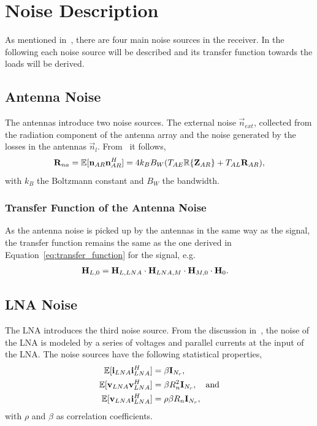 \section{Noise Description}
\label{sec:noise_description}

As mentioned in~\cite{Yahia2013}, there are four main noise sources in the receiver.
In the following each noise source will be described and its transfer function towards the loads will be derived. 

\subsection{Antenna Noise}
\label{sec:antenna_noise}

The antennas introduce two noise sources.
The external noise $\vec{n}_{ext}$, collected from the radiation component of the antenna array and the noise generated by the losses in the antennas $\vec{n}_l$.
From~\cite{Twiss1955} it follows, 
\begin{equation}
\label{eq:cov_ant}
\mathbf{R}_{na} = \mathbb{E}[\mathbf{n}_{AR}\mathbf{n}_{AR}^H] = 4 k_B B_W(T_{AE}\mathbb{R}\{\mathbf{Z}_{AR}\}+T_{AL}\mathbf{R}_{AR}),
\end{equation}
with $k_B$ the Boltzmann constant and $B_W$ the bandwidth.

\subsubsection{Transfer Function of the Antenna Noise}
\label{sec:antenna_noise_transf}
As the antenna noise is picked up by the antennas in the same way as the signal, the transfer function remains the same as the one derived in Equation~\eqref{eq:transfer_function} for the signal, e.g.
\begin{align}
\mathbf{H}_{L,0} &= \mathbf{H}_{L,LNA}\cdot\mathbf{H}_{LNA,M}\cdot\mathbf{H}_{M,0}\cdot\mathbf{H}_{0}.
\end{align}

\subsection{LNA Noise}
\label{sec:lna_noise}

The LNA introduces the third noise source.
From the discussion in~\cite{Nossek}, the noise of the LNA is modeled by a series of voltages and parallel currents at the input of the LNA.
The noise sources have the following statistical properties,
\begin{align}
\label{eq:cov_lna}
\mathbb{E}[\mathbf{i}_{LNA}\mathbf{i}_{LNA}^H] &= \beta \mathbf{I}_{N_r},\\\nonumber
\mathbb{E}[\mathbf{v}_{LNA}\mathbf{v}_{LNA}^H] &= \beta R_n^2\mathbf{I}_{N_r},\quad\text{and}\\\nonumber
\mathbb{E}[\mathbf{v}_{LNA}\mathbf{i}_{LNA}^H] &= \rho \beta R_n\mathbf{I}_{N_r},
\end{align}
with $\rho$ and $\beta$ as correlation coefficients.

